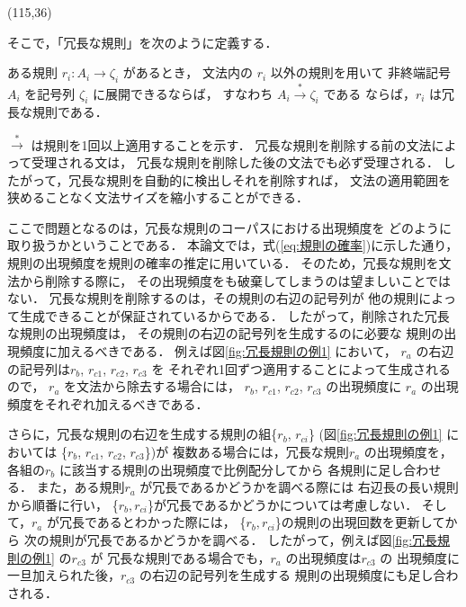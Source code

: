 \begin{center}
  \bigskip
  \atari(115,36)
\end{center}

そこで，「冗長な規則」を次のように定義する．
\begin{center}
  \begin{minipage}{0.73\textwidth}
    ある規則 $r_i : A_i \rightarrow \zeta_i$ があるとき，
    文法内の $r_i$ 以外の規則を用いて
    非終端記号 $A_i$ を記号列 $\zeta_i$ に展開できるならば，
    すなわち $A_i \stackrel{*}{\rightarrow} \zeta_i$ である
    ならば，$r_i$ は冗長な規則である．
  \end{minipage}
\end{center}

\noindent
$\stackrel{*}{\rightarrow}$ は規則を1回以上適用することを示す．
冗長な規則を削除する前の文法によって受理される文は，
冗長な規則を削除した後の文法でも必ず受理される．
したがって，冗長な規則を自動的に検出しそれを削除すれば，
文法の適用範囲を狭めることなく文法サイズを縮小することができる．

ここで問題となるのは，冗長な規則のコーパスにおける出現頻度を
どのように取り扱うかということである．
本論文では，式(\ref{eq:規則の確率})に示した通り，
規則の出現頻度を規則の確率の推定に用いている．
そのため，冗長な規則を文法から削除する際に，
その出現頻度をも破棄してしまうのは望ましいことではない．
冗長な規則を削除するのは，その規則の右辺の記号列が
他の規則によって生成できることが保証されているからである．
したがって，削除された冗長な規則の出現頻度は，
その規則の右辺の記号列を生成するのに必要な
規則の出現頻度に加えるべきである．
例えば図\ref{fig:冗長規則の例1} において，
$r_a$ の右辺の記号列は$r_b$, $r_{c1}$, $r_{c2}$, $r_{c3}$ を
それぞれ1回ずつ適用することによって生成されるので，
$r_a$ を文法から除去する場合には，
$r_b$, $r_{c1}$, $r_{c2}$, $r_{c3}$ の出現頻度に
$r_a$ の出現頻度をそれぞれ加えるべきである．

さらに，冗長な規則の右辺を生成する規則の組\{$r_b$, $r_{ci}$\}
(図\ref{fig:冗長規則の例1} においては
\{$r_b$, $r_{c1}$, $r_{c2}$, $r_{c3}$\})が
複数ある場合には，冗長な規則$r_a$ の出現頻度を，
各組の$r_b$ に該当する規則の出現頻度で比例配分してから
各規則に足し合わせる．
また，ある規則$r_a$ が冗長であるかどうかを調べる際には
右辺長の長い規則から順番に行い，
\{$r_b, r_{ci}$\}が冗長であるかどうかについては考慮しない．
そして，$r_a$ が冗長であるとわかった際には，
\{$r_b, r_{ci}$\}の規則の出現回数を更新してから
次の規則が冗長であるかどうかを調べる．
したがって，例えば図\ref{fig:冗長規則の例1} の$r_{c3}$ が
冗長な規則である場合でも，$r_a$ の出現頻度は$r_{c3}$ の
出現頻度に一旦加えられた後，$r_{c3}$ の右辺の記号列を生成する
規則の出現頻度にも足し合わされる．

